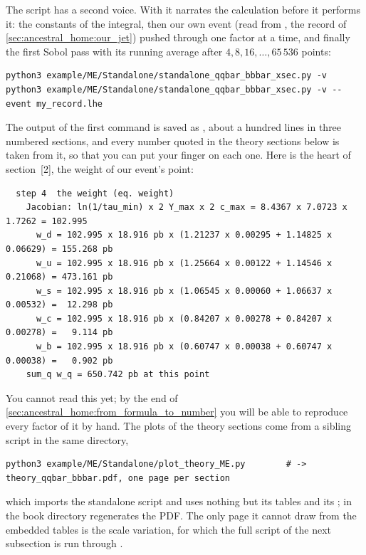 The script has a second voice. With  it narrates the calculation
before it performs it: the constants of the integral, then our own event
(read from , the record of
\cref{sec:ancestral_home:our_jet}) pushed through  one
factor at a time, and finally the first Sobol pass with its running average
after $4, 8, 16, \dots, 65\,536$ points:
\begin{verbatim}
python3 example/ME/Standalone/standalone_qqbar_bbbar_xsec.py -v
python3 example/ME/Standalone/standalone_qqbar_bbbar_xsec.py -v --event my_record.lhe
\end{verbatim}
The output of the first command is saved as
, about a hundred
lines in three numbered sections, and every number quoted in the theory
sections below is taken from it, so that you can put your finger on each
one. Here is the heart of section~[2], the weight of our event's point:
\begin{verbatim}
  step 4  the weight (eq. weight)
    Jacobian: ln(1/tau_min) x 2 Y_max x 2 c_max = 8.4367 x 7.0723 x 1.7262 = 102.995
      w_d = 102.995 x 18.916 pb x (1.21237 x 0.00295 + 1.14825 x 0.06629) = 155.268 pb
      w_u = 102.995 x 18.916 pb x (1.25664 x 0.00122 + 1.14546 x 0.21068) = 473.161 pb
      w_s = 102.995 x 18.916 pb x (1.06545 x 0.00060 + 1.06637 x 0.00532) =  12.298 pb
      w_c = 102.995 x 18.916 pb x (0.84207 x 0.00278 + 0.84207 x 0.00278) =   9.114 pb
      w_b = 102.995 x 18.916 pb x (0.60747 x 0.00038 + 0.60747 x 0.00038) =   0.902 pb
    sum_q w_q = 650.742 pb at this point
\end{verbatim}
You cannot read this yet; by the end of \cref{sec:ancestral_home:from_formula_to_number}
you will be able to reproduce every factor of it by hand. The plots of the
theory sections come from a sibling script in the same directory,
\begin{verbatim}
python3 example/ME/Standalone/plot_theory_ME.py        # -> theory_qqbar_bbbar.pdf, one page per section
\end{verbatim}
which imports the standalone script and uses nothing but its tables and its
;  in the book directory regenerates
the PDF. The only page it cannot draw from the embedded tables is the scale
variation, for which the full script of the next subsection is run through
.

